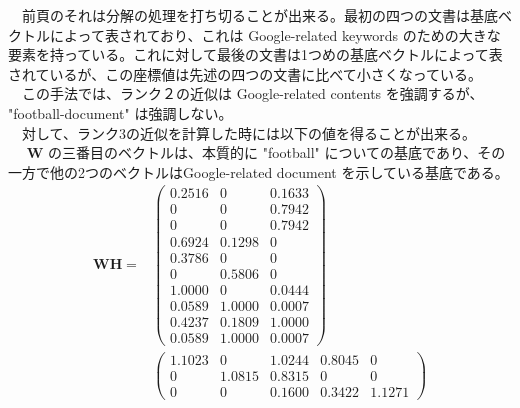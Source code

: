 \documentclass[a4paper,10pt]{jarticle}
\begin{document}
　前頁のそれは分解の処理を打ち切ることが出来る。最初の四つの文書は基底ベクトルによって表されており、これは Google-related keywords のための大きな要素を持っている。これに対して最後の文書は1つめの基底ベクトルによって表されているが、この座標値は先述の四つの文書に比べて小さくなっている。\\
　この手法では、ランク２の近似は Google-related contents を強調するが、 "football-document" は強調しない。\\

　対して、ランク3の近似を計算した時には以下の値を得ることが出来る。\\
　 \(\bm{W}\) の三番目のベクトルは、本質的に "football" についての基底であり、その一方で他の2つのベクトルはGoogle-related document を示している基底である。\\
\begin{align*}
\bm{W}\bm{H} =
&\begin{pmatrix}
0.2516 & 0 & 0.1633 \\
0 & 0 & 0.7942 \\
0 & 0 & 0.7942 \\
0.6924 & 0.1298 & 0 \\
0.3786 & 0 & 0 \\
0 & 0.5806 & 0 \\
1.0000 & 0 & 0.0444 \\
0.0589 & 1.0000 & 0.0007 \\
0.4237 & 0.1809 & 1.0000 \\
0.0589 & 1.0000 & 0.0007  
\end{pmatrix}\\
&\begin{pmatrix}
1.1023 & 0 & 1.0244 & 0.8045 & 0 \\
0 & 1.0815 & 0.8315 & 0 & 0 \\
0 & 0 & 0.1600 & 0.3422 & 1.1271 
\end{pmatrix}
\end{align*}
\end{document}
